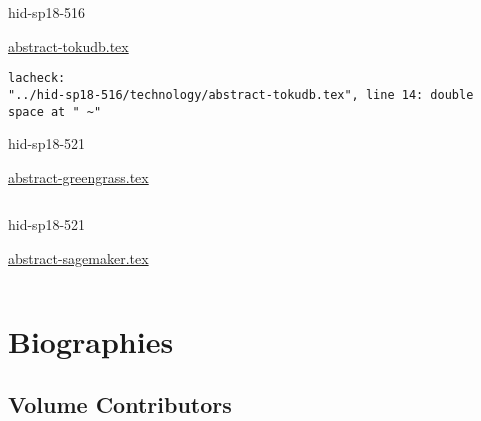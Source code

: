 

\begin{IU}

hid-sp18-516

\href{https://github.com/cloudmesh-community/hid-sp18-516/blob/master//technology/abstract-tokudb.tex}{abstract-tokudb.tex}

\begin{tiny}
\begin{verbatim}
lacheck:
"../hid-sp18-516/technology/abstract-tokudb.tex", line 14: double space at " ~"
\end{verbatim}
\end{tiny}
\end{IU}



\begin{IU}

hid-sp18-521

\href{https://github.com/cloudmesh-community/hid-sp18-521/blob/master//technology/abstract-greengrass.tex}{abstract-greengrass.tex}

\begin{tiny}
\begin{verbatim}
\end{verbatim}
\end{tiny}
\end{IU}



\begin{IU}

hid-sp18-521

\href{https://github.com/cloudmesh-community/hid-sp18-521/blob/master//technology/abstract-sagemaker.tex}{abstract-sagemaker.tex}

\begin{tiny}
\begin{verbatim}
\end{verbatim}
\end{tiny}
\end{IU}

\part{Biographies}
\chapter{Volume Contributors}


